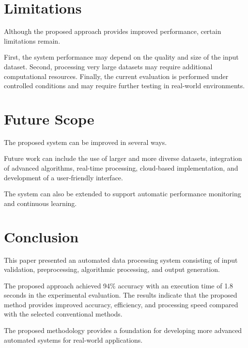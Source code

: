 \documentclass[conference]{IEEEtran}
\begin{document}
\section{Limitations}

Although the proposed approach provides improved performance,
certain limitations remain.

First, the system performance may depend on the quality and
size of the input dataset. Second, processing very large
datasets may require additional computational resources.
Finally, the current evaluation is performed under controlled
conditions and may require further testing in real-world
environments.


\section{Future Scope}

The proposed system can be improved in several ways.

Future work can include the use of larger and more diverse
datasets, integration of advanced algorithms, real-time
processing, cloud-based implementation, and development of
a user-friendly interface.

The system can also be extended to support automatic
performance monitoring and continuous learning.


\section{Conclusion}

This paper presented an automated data processing system
consisting of input validation, preprocessing, algorithmic
processing, and output generation.

The proposed approach achieved 94\% accuracy with an
execution time of 1.8 seconds in the experimental evaluation.
The results indicate that the proposed method provides
improved accuracy, efficiency, and processing speed compared
with the selected conventional methods.

The proposed methodology provides a foundation for developing
more advanced automated systems for real-world applications.
\end{document}
